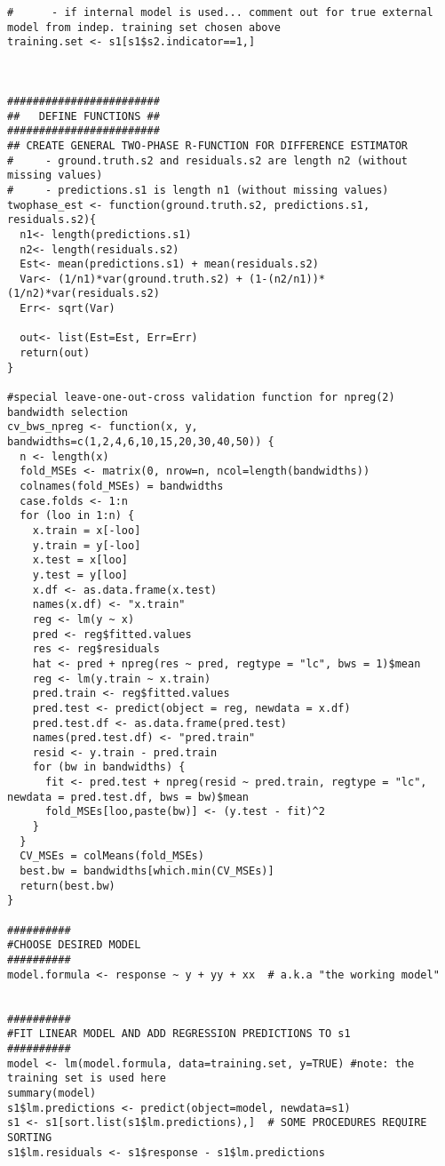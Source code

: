 \documentclass[a4paper,12pt,leqno, titlepage]{article}
\begin{document}
\begin{appendix}
{{{{\begin{verbatim}
#      - if internal model is used... comment out for true external model from indep. training set chosen above
training.set <- s1[s1$s2.indicator==1,]



########################
##   DEFINE FUNCTIONS ##
########################
## CREATE GENERAL TWO-PHASE R-FUNCTION FOR DIFFERENCE ESTIMATOR
#     - ground.truth.s2 and residuals.s2 are length n2 (without missing values)
#     - predictions.s1 is length n1 (without missing values)
twophase_est <- function(ground.truth.s2, predictions.s1, residuals.s2){
  n1<- length(predictions.s1)
  n2<- length(residuals.s2)
  Est<- mean(predictions.s1) + mean(residuals.s2)
  Var<- (1/n1)*var(ground.truth.s2) + (1-(n2/n1))*(1/n2)*var(residuals.s2)
  Err<- sqrt(Var)

  out<- list(Est=Est, Err=Err)
  return(out)
}

#special leave-one-out-cross validation function for npreg(2) bandwidth selection
cv_bws_npreg <- function(x, y, bandwidths=c(1,2,4,6,10,15,20,30,40,50)) {
  n <- length(x)
  fold_MSEs <- matrix(0, nrow=n, ncol=length(bandwidths))
  colnames(fold_MSEs) = bandwidths
  case.folds <- 1:n
  for (loo in 1:n) {
    x.train = x[-loo]
    y.train = y[-loo]
    x.test = x[loo]
    y.test = y[loo]
    x.df <- as.data.frame(x.test)
    names(x.df) <- "x.train"
    reg <- lm(y ~ x)
    pred <- reg$fitted.values
    res <- reg$residuals
    hat <- pred + npreg(res ~ pred, regtype = "lc", bws = 1)$mean
    reg <- lm(y.train ~ x.train)
    pred.train <- reg$fitted.values
    pred.test <- predict(object = reg, newdata = x.df)
    pred.test.df <- as.data.frame(pred.test)
    names(pred.test.df) <- "pred.train"
    resid <- y.train - pred.train
    for (bw in bandwidths) {
      fit <- pred.test + npreg(resid ~ pred.train, regtype = "lc", newdata = pred.test.df, bws = bw)$mean
      fold_MSEs[loo,paste(bw)] <- (y.test - fit)^2
    }
  }
  CV_MSEs = colMeans(fold_MSEs)
  best.bw = bandwidths[which.min(CV_MSEs)]
  return(best.bw)
}

##########
#CHOOSE DESIRED MODEL
##########
model.formula <- response ~ y + yy + xx  # a.k.a "the working model"


##########
#FIT LINEAR MODEL AND ADD REGRESSION PREDICTIONS TO s1
##########
model <- lm(model.formula, data=training.set, y=TRUE) #note: the training set is used here
summary(model)
s1$lm.predictions <- predict(object=model, newdata=s1)
s1 <- s1[sort.list(s1$lm.predictions),]  # SOME PROCEDURES REQUIRE SORTING
s1$lm.residuals <- s1$response - s1$lm.predictions



\end{verbatim}}}}}
\end{appendix}
\end{document}
